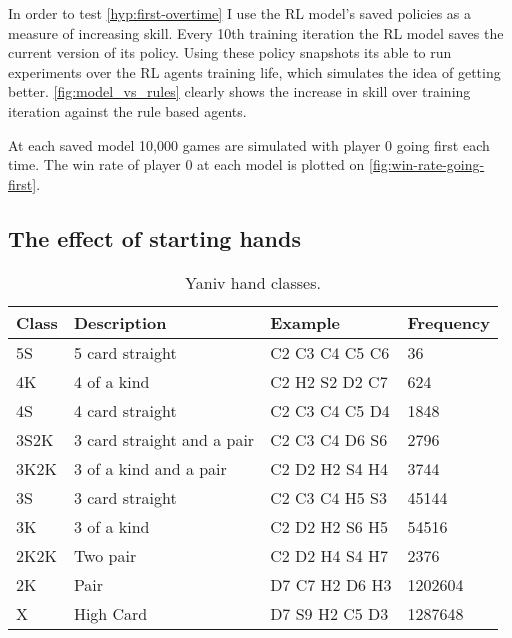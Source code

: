 \documentclass[../main.tex]{subfiles}
\begin{document}

In order to test \cref{hyp:first-overtime} I use the RL model's saved policies as a measure of increasing skill. Every 10th training iteration the RL model saves the current version of its policy. Using these policy snapshots its able to run experiments over the RL agents training life, which simulates the idea of getting better. \cref{fig:model_vs_rules} clearly shows the increase in skill over training iteration against the rule based agents. 

At each saved model 10,000 games are simulated with player 0 going first each time. The win rate of player 0 at each model is plotted on \cref{fig:win-rate-going-first}.


\subsection{The effect of starting hands}
\begin{table}[]
\centering
\begin{tabular}{@{}llll@{}}
\toprule
Class & Description                & Example        & Frequency \\ \midrule
5S    & 5 card straight            & C2 C3 C4 C5 C6 & 36        \\
4K    & 4 of a kind                & C2 H2 S2 D2 C7 & 624       \\
4S    & 4 card straight            & C2 C3 C4 C5 D4 & 1848      \\
3S2K  & 3 card straight and a pair & C2 C3 C4 D6 S6 & 2796      \\
3K2K  & 3 of a kind and a pair     & C2 D2 H2 S4 H4 & 3744      \\
3S    & 3 card straight            & C2 C3 C4 H5 S3 & 45144     \\
3K    & 3 of a kind                & C2 D2 H2 S6 H5 & 54516     \\
2K2K  & Two pair                   & C2 D2 H4 S4 H7 & 2376      \\
2K    & Pair                       & D7 C7 H2 D6 H3 & 1202604   \\
X     & High Card                  & D7 S9 H2 C5 D3 & 1287648   \\ \bottomrule
\end{tabular}
\caption{Yaniv hand classes.}
\label{tab:hand-classes}
\end{table}
\end{document}
